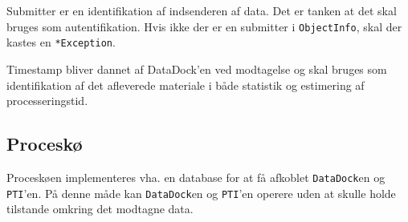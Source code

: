 \documentclass{article}
\begin{document}
Submitter er en identifikation af indsenderen af data. Det er tanken
at det skal bruges som autentifikation. Hvis ikke der er en submitter
i \texttt{ObjectInfo}, skal der kastes en \texttt{*Exception}.

Timestamp bliver dannet af DataDock'en ved modtagelse og skal bruges
som identifikation af det afleverede materiale i både statistik og
estimering af processeringstid.

\subsection{Proceskø}

Proceskøen implementeres vha. en database for at få afkoblet
\texttt{DataDock}en og \texttt{PTI}'en.  På denne måde kan
\texttt{DataDock}en og \texttt{PTI}'en operere uden at skulle holde
tilstande omkring det modtagne data.
\end{document}
